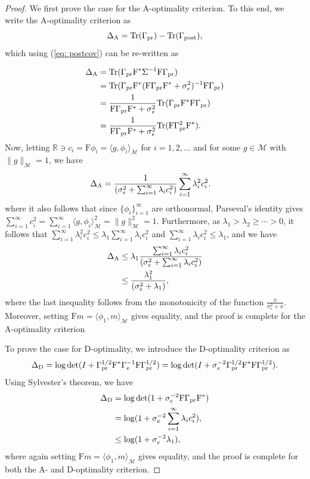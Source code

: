 \documentclass[ba]{imsart}
\theoremstyle{plain}
\newcommand{\prcov}{\Gamma_{\mathrm{pr}}}
\newcommand{\postcov}{\Gamma_{\mathrm{post}}}
\newcommand{\F}{\mathrm{F}}
\newcommand{\Gammay}{\Sigma}
\newcommand{\M}{\mathcal{M}}
\begin{document}
\begin{proof}
We first prove the case for the A-optimality criterion. To this end, we write the A-optimality criterion as
\[\Delta_{\rm A}=\text{Tr}(\prcov)-\text{Tr}(\postcov),\]
which using (\ref{eq: postcov}) can be re-written as

\[
\begin{aligned}
\Delta_{\rm A}&=\text{Tr}(\prcov \F^* \Gammay^{-1} \F\prcov)\\
&=\text{Tr}(\prcov \F^* (\F\prcov\F^*+\sigma_e^2)^{-1} \F\prcov)\\
&=\frac{1}{\F\prcov\F^*+\sigma_e^2}\text{Tr}(\prcov \F^* \F\prcov)\\
&=\frac{1}{\F\prcov\F^*+\sigma_e^2}\text{Tr}(\F\prcov^2\F^*).
\end{aligned}
\]
Now, letting $\mathbb{R}\ni c_i=\F \phi_i=\langle g,\phi_i\rangle_\M$ for $i=1,2,\dots$ and for some $g\in\M$ with $\|g\|_\M=1$, we have
\[
\begin{aligned}
\Delta_{\rm A}&=\frac{1}{(\sigma_e^2+\sum_{i=1}^\infty\lambda_i c_i^2)}\sum_{i=1}^\infty\lambda_i^2 c_i^2.
\end{aligned}
\]
where it also follows that since $\{\phi_i\}_{i=1}^\infty$ are orthonormal, Parseval's identity gives $\sum_{i=1}^\infty c_i^2=\sum_{i=1}^\infty\langle g,\phi_i\rangle_\M^2=\|g\|^2_\M=1$. Furthermore, as $\lambda_1>\lambda_2\geq\cdots >0$, it follows that $\sum_{i=1}^\infty\lambda_i^2 c_i^2\leq\lambda_1\sum_{i=1}^\infty\lambda_i c_i^2$ and $\sum_{i=1}^\infty\lambda_i c_i^2\leq\lambda_1$, and we have 
\[
\begin{aligned}
\Delta_{\rm A}&\leq\lambda_1\frac{\sum_{i=1}^\infty\lambda_i c_i^2}{(\sigma_e^2+\sum_{i=1}^\infty\lambda_i c_i^2)}\\
&\leq\frac{\lambda_1^2}{(\sigma_e^2+\lambda_1)},\\
\end{aligned}
\]
where the last inequality follows from the monotonicity of the function $\frac{x}{\sigma_e^2+x}$.
Moreover, setting $\F m=\langle \phi_1,m\rangle_\M$ gives equality, and the proof is complete for the A-optimality criterion

To prove the case for D-optimality, we introduce the D-optimality criterion as
\[\Delta_{\rm D}=\log\det(I+\prcov^{1/2} \F^* \Gamma_e^{-1} \F\prcov^{1/2})=\log\det(I+\sigma_e^{-2}\prcov^{1/2} \F^*\F\prcov^{1/2}).\]
Using Sylvester's theorem, we have
\[
\begin{aligned}
\Delta_{\rm D}&=\log\det(1+\sigma_e^{-2}\F\prcov \F^*)\\
&=\log(1+\sigma_e^{-2}\sum_{i=1}^\infty\lambda_i c_i^2),\\
&\leq\log(1+\sigma_e^{-2}\lambda_1),\\
\end{aligned}
\]
where again setting $\F m=\langle \phi_1,m\rangle_\M$ gives equality, and the proof is complete for both the A- and D-optimality criterion.
\end{proof}
\end{document}

